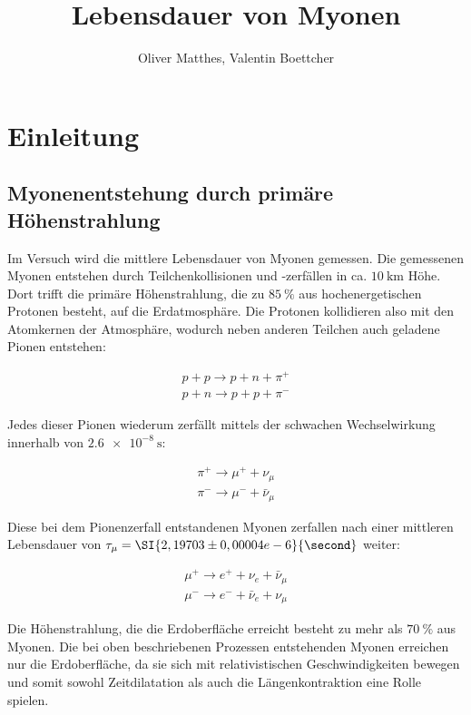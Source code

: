 \documentclass[slug=LM, room=Andreas-Schubert-Bau\,\ K\ 1A, supervisor=Anne-Sophie\ Berthold, coursedate=13.\ 12.\ 2019]{../../Lab_Report_LaTeX/lab_report}
\title{Lebensdauer von Myonen}
\author{Oliver Matthes, Valentin Boettcher}
\begin{document}
\maketitle

\section{Einleitung}
\label{sec:einl}

\subsection{Myonenentstehung durch primäre Höhenstrahlung}
\label{sec:myonenenst}

Im Versuch wird die mittlere Lebensdauer von Myonen gemessen.
Die gemessenen Myonen entstehen durch Teilchenkollisionen und -zerfällen in ca.
\(\SI{10}{\kilo\metre}\) Höhe. Dort trifft die primäre Höhenstrahlung, die zu
\(\SI{85}{\percent}\) aus hochenergetischen Protonen besteht, auf die Erdatmosphäre.
Die Protonen kollidieren also mit den Atomkernen der Atmosphäre, wodurch neben anderen Teilchen
auch geladene Pionen entstehen:

\begin{align}\label{eq:pionen}
 p + p \rightarrow p + n + \pi^+ \\
 p + n \rightarrow p + p + \pi^- 
\end{align}

Jedes dieser Pionen wiederum zerfällt mittels der schwachen Wechselwirkung innerhalb von 
\(\SI{2,6e-8}{\second}\):

\begin{align}\label{eq:myonen}
\pi^+ \rightarrow \mu^+ + \nu_\mu \\
\pi^- \rightarrow \mu^- + \bar\nu_\mu 
\end{align}

Diese bei dem Pionenzerfall entstandenen Myonen zerfallen nach einer mittleren Lebensdauer von
\(\tau_\mu = \SI{2,19703\pm0,00004e-6}{\second}\) weiter:

\begin{align}
	\mu^+ \rightarrow e^+ + \nu_e + \bar\nu_\mu \\
	\mu^- \rightarrow e^- + \bar\nu_e + \nu_\mu
\end{align}

Die Höhenstrahlung, die die Erdoberfläche erreicht besteht zu mehr als \(\SI{70}{\percent}\)
aus Myonen. Die bei oben beschriebenen Prozessen entstehenden Myonen erreichen nur die 
Erdoberfläche, da sie sich mit relativistischen Geschwindigkeiten bewegen und somit sowohl
Zeitdilatation als auch die Längenkontraktion eine Rolle spielen.\\
\end{document}
